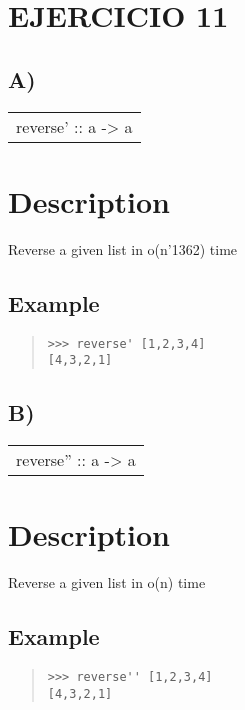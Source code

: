 \section{EJERCICIO 11}
\subsection{A)}
\begin{haddockdesc}
\item[\begin{tabular}{@{}l}
reverse' :: {\char 91}a{\char 93} -> {\char 91}a{\char 93}
\end{tabular}]
{\haddockbegindoc
\section*{Description}
Reverse a given list in o(n{\char '136}2) time\par
\subsection*{Example}
\begin{quote}
{\haddockverb\begin{verbatim}
>>> reverse' [1,2,3,4]
[4,3,2,1]

\end{verbatim}}
\end{quote}}
\end{haddockdesc}
\subsection{B)}
\begin{haddockdesc}
\item[\begin{tabular}{@{}l}
reverse'' :: {\char 91}a{\char 93} -> {\char 91}a{\char 93}
\end{tabular}]
{\haddockbegindoc
\section*{Description}
Reverse a given list in o(n) time\par
\subsection*{Example}
\begin{quote}
{\haddockverb\begin{verbatim}
>>> reverse'' [1,2,3,4]
[4,3,2,1]

\end{verbatim}}
\end{quote}}
\end{haddockdesc}